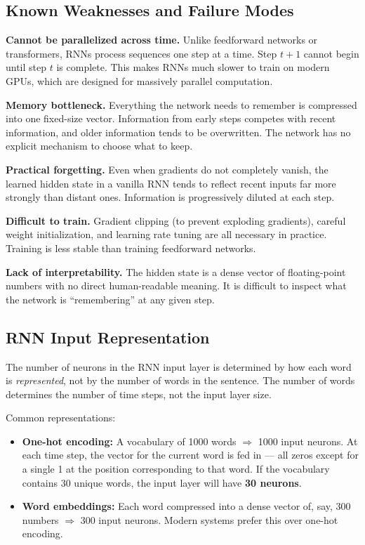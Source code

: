 \documentclass[12pt,a4paper]{article}
\begin{document}
\subsection{Known Weaknesses and Failure Modes}

\textbf{Cannot be parallelized across time.}
Unlike feedforward networks or transformers, RNNs process sequences one step at a time.
Step $t{+}1$ cannot begin until step $t$ is complete. This makes RNNs much slower to
train on modern GPUs, which are designed for massively parallel computation.

\textbf{Memory bottleneck.}
Everything the network needs to remember is compressed into one fixed-size vector.
Information from early steps competes with recent information, and older information
tends to be overwritten. The network has no explicit mechanism to choose what to keep.

\textbf{Practical forgetting.}
Even when gradients do not completely vanish, the learned hidden state in a vanilla RNN
tends to reflect recent inputs far more strongly than distant ones. Information is
progressively diluted at each step.

\textbf{Difficult to train.}
Gradient clipping (to prevent exploding gradients), careful weight initialization,
and learning rate tuning are all necessary in practice. Training is less stable than
training feedforward networks.

\textbf{Lack of interpretability.}
The hidden state is a dense vector of floating-point numbers with no direct
human-readable meaning. It is difficult to inspect what the network is ``remembering''
at any given step.

\subsection{RNN Input Representation}

The number of neurons in the RNN input layer is determined by how each word is
\textit{represented}, not by the number of words in the sentence. The number of words
determines the number of time steps, not the input layer size.

Common representations:
\begin{itemize}
    \item \textbf{One-hot encoding:} A vocabulary of 1000 words $\Rightarrow$ 1000 input
          neurons. At each time step, the vector for the current word is fed in --- all
          zeros except for a single 1 at the position corresponding to that word. If the
          vocabulary contains 30 unique words, the input layer will have \textbf{30
          neurons}.
    \item \textbf{Word embeddings:} Each word compressed into a dense vector of, say,
          300 numbers $\Rightarrow$ 300 input neurons. Modern systems prefer this over
          one-hot encoding.
\end{itemize}
\end{document}
